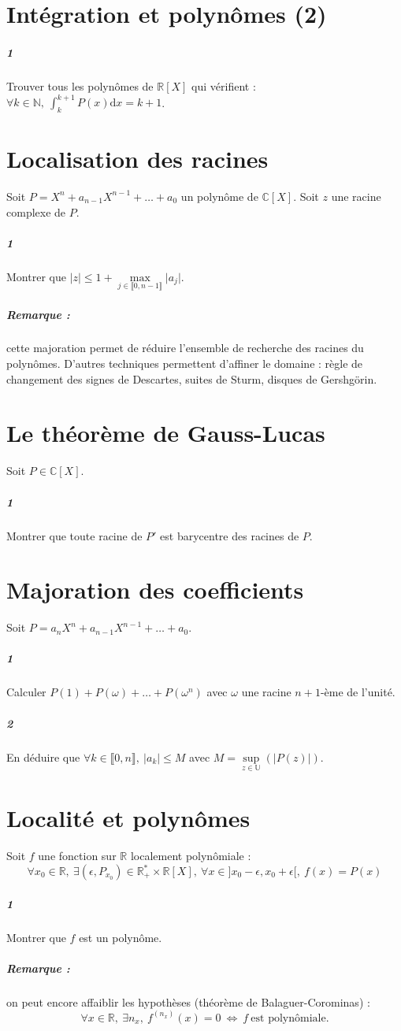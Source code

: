 \documentclass[10pt,a4paper]{article}
\begin{document}
\section{Intégration et polynômes (2)}
\subparagraph{1}Trouver tous les polynômes de $\mathbb{R}[X]$ qui vérifient : $\forall k \in \mathbb{N}, \ \int_k^{k+1}P(x) \text{d}x= k+1$.
\section{Localisation des racines}
Soit $P=X^n+a_{n-1}X^{n-1}+ \dots +a_0$ un polynôme de $\mathbb{C}[X]$. Soit $z$ une racine complexe de $P$.
\subparagraph{1}Montrer que $\vert z \vert \le 1 + \underset{j \in \llbracket 0,n-1 \rrbracket}{\max} \vert a_j \vert$.
\subparagraph{Remarque :} cette majoration permet de réduire l'ensemble de recherche des racines du polynômes. D'autres techniques permettent d'affiner le domaine : règle de changement des signes de Descartes, suites de Sturm, disques de Gershgörin.
\section{Le théorème de Gauss-Lucas}
Soit $P \in \mathbb{C}[X]$.
\subparagraph{1}Montrer que toute racine de $P'$ est barycentre des racines de $P$.
\section{Majoration des coefficients}
Soit $P=a_nX^n+a_{n-1}X^{n-1}+ \dots +a_0$.
\subparagraph{1}Calculer $P(1)+P(\omega)+\dots+P(\omega^n)$ avec $\omega$ une racine $n+1$-ème de l'unité.
\subparagraph{2}En déduire que $\forall k \in \llbracket 0,n\rrbracket, \ \vert a_k \vert \le M$ avec $M=\underset{z \in \mathbb{U}}{\sup}(\vert P(z) \vert)$.
\section{Localité et polynômes}
Soit $f$ une fonction sur $\mathbb{R}$ localement polynômiale :
\begin{equation*}
\forall x_0 \in \mathbb{R}, \ \exists (\epsilon,P_{x_0}) \in \mathbb{R}_+^* \times \mathbb{R}[X], \ \forall x \in ]x_0-\epsilon,x_0+\epsilon[, \ f(x)=P(x)
\end{equation*}
\subparagraph{1}Montrer que $f$ est un polynôme.
\subparagraph{Remarque :} on peut encore affaiblir les hypothèses (théorème de Balaguer-Corominas) :
\begin{equation*}
\forall x \in \mathbb{R}, \ \exists n_x, \ f^{(n_x)}(x)=0 \ \Leftrightarrow \ f \ \text{est polynômiale.}
\end{equation*}
\end{document}
